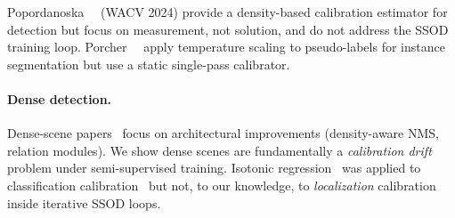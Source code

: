 \documentclass[10pt,twocolumn,letterpaper]{article}
\begin{document}
\begin{table}[t]
  \centering
  \caption{\textbf{CalibPL vs.\ Kuzucu \etal~\cite{kuzucu2024calibration}:
mechanistic comparison.} The two works are \emph{complementary}---not
competing---because the settings differ fundamentally.}
  \vspace{2pt}
  \setlength{\tabcolsep}{4pt}
  \label{tab:kuzucu_diff}
  \vspace{-6pt}
\end{table}

Popordanoska~\etal~\cite{popordanoska2024} (WACV 2024) provide a density-based
calibration estimator for detection but focus on measurement, not solution, and
do not address the SSOD training loop.
Porcher~\etal~\cite{metacalib2025} apply temperature scaling to pseudo-labels
for instance segmentation but use a static single-pass calibrator.

\paragraph{Dense detection.}
Dense-scene papers~\cite{sku110k2019,crowdhuman2018,visdrone2018,densessod2021}
focus on architectural improvements (density-aware NMS, relation modules). We
show dense scenes are fundamentally a \emph{calibration drift} problem under
semi-supervised training. Isotonic regression~\cite{ayer1955empirical,robertson1988order}
was applied to classification calibration~\cite{zadrozny2002} but not, to our
knowledge, to \emph{localization} calibration inside iterative SSOD loops.
\end{document}
